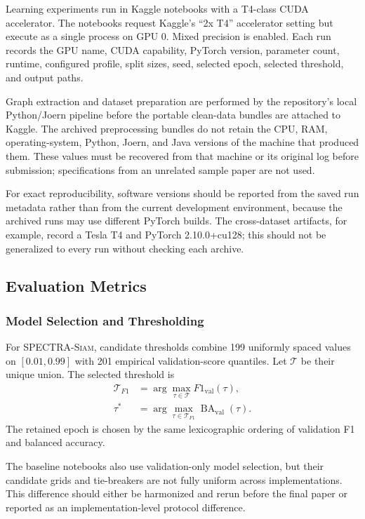 \documentclass[authoryear,final,5p,times,twocolumn]{elsarticle}
\newcommand{\method}{\textsc{SPECTRA-Siam}}
\newcommand{\added}[1]{{\color{green!50!black}#1}}
\theoremstyle{plain}
\begin{document}
Learning experiments run in Kaggle notebooks with a T4-class CUDA accelerator.
\added{The notebooks request Kaggle's ``2x T4'' accelerator setting but execute as a
single process on GPU 0. Mixed precision is enabled. Each run records the GPU
name, CUDA capability, PyTorch version, parameter count, runtime, configured
profile, split sizes, seed, selected epoch, selected threshold, and output paths.}

\added{Graph extraction and dataset preparation are performed by the repository's local
Python/Joern pipeline before the portable clean-data bundles are attached to
Kaggle. The archived preprocessing bundles do not retain the CPU, RAM,
operating-system, Python, Joern, and Java versions of the machine that produced
them. These values must be recovered from that machine or its original log
before submission; specifications from an unrelated sample paper are not used.}

\added{For exact reproducibility, software versions should be reported from the saved
run metadata rather than from the current development environment, because the
archived runs may use different PyTorch builds. The cross-dataset artifacts, for
example, record a Tesla T4 and PyTorch 2.10.0+cu128; this should not be generalized
to every run without checking each archive.}

\subsection{Evaluation Metrics}
\label{sec:metrics}

\subsubsection{Model Selection and Thresholding}
\label{sec:thresholding}

\added{For \method{}, candidate thresholds combine 199 uniformly spaced values
on $[0.01,0.99]$ with 201 empirical validation-score quantiles.} Let
$\mathcal{T}$ be their unique union. The selected threshold is
\begin{align}
\mathcal{T}_{F1}
&=\arg\max_{\tau\in\mathcal{T}}F1_{\mathrm{val}}(\tau),\\
\tau^*
&=\arg\max_{\tau\in\mathcal{T}_{F1}}
\operatorname{BA}_{\mathrm{val}}(\tau).
\label{eq:threshold_selection}
\end{align}
The retained epoch is chosen by the same lexicographic ordering of validation
F1 and balanced accuracy.

\added{The baseline notebooks also use validation-only model selection, but
their candidate grids and tie-breakers are not fully uniform across
implementations. This difference should either be harmonized and rerun before
the final paper or reported as an implementation-level protocol difference.}
\end{document}
